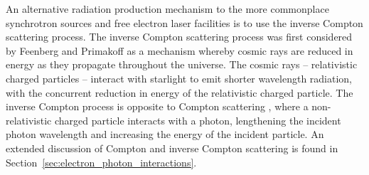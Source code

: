 \documentclass[../main.tex]{subfiles}
\begin{document}
An alternative radiation production mechanism to the more commonplace synchrotron sources and free electron laser facilities is to use the inverse Compton scattering process. The inverse Compton scattering process was first considered by Feenberg and Primakoff \cite{feenberg1948interaction} as a mechanism whereby cosmic rays are reduced in energy as they propagate throughout the universe. The cosmic rays -- relativistic charged particles -- interact with starlight to emit shorter wavelength radiation, with the concurrent reduction in energy of the relativistic charged particle. The inverse Compton process is opposite to Compton scattering \cite{compton1923quantum}, where a non-relativistic charged particle interacts with a photon, lengthening the incident photon wavelength and increasing the energy of the incident particle. An extended discussion of Compton and inverse Compton scattering is found in Section~\ref{sec:electron_photon_interactions}. 
\end{document}
